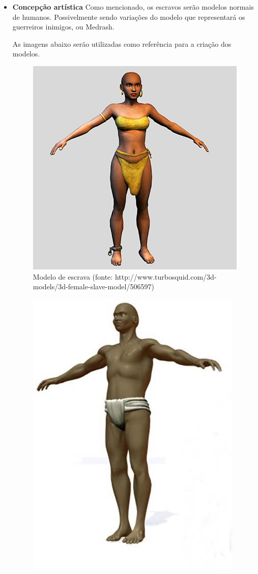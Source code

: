 \begin{itemize}
\item{\bf Concepção artística}
Como mencionado, os escravos serão modelos normais de humanos. Possivelmente sendo variações do modelo que representará os guerreiros inimigos, ou Medrash.


As imagens abaixo serão utilizadas como referência para a criação dos modelos.

\begin{figure}[ht]
 \centering
 \includegraphics[scale=0.5]{Imagens/mulher01.png}
 \caption{Modelo de escrava (fonte: http://www.turbosquid.com/3d-models/3d-female-slave-model/506597)}
\label{img:mulher}
\end{figure}
\newpage
\begin{figure}[ht]
 \centering
 \includegraphics[scale=0.5]{Imagens/escravo01.png}

\end{figure}
\end{itemize}
